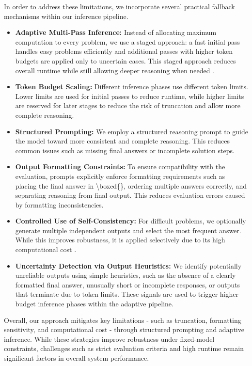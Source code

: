 \documentclass{article}
\begin{document}
In order to address these limitations, we incorporate several practical fallback mechanisms within our inference pipeline.
\begin{itemize}
    \item \textbf{Adaptive Multi-Pass Inference:} Instead of allocating maximum computation to every problem, we use a staged approach: a fast initial pass handles easy problems efficiently and additional passes with higher token budgets are applied only to uncertain cases. This staged approach reduces overall runtime while still allowing deeper reasoning when needed \citet{snell2024scaling}.
    \item \textbf{Token Budget Scaling:} Different inference phases use different token limits. Lower limits are used for initial passes to reduce runtime, while higher limits are reserved for later stages to reduce the risk of truncation and allow more complete reasoning.
    \item \textbf{Structured Prompting:} We employ a structured reasoning prompt to guide the model toward more consistent and complete reasoning. This reduces common issues such as missing final answers or incomplete solution steps.
    \item \textbf{Output Formatting Constraints:} To ensure compatibility with the evaluation, prompts explicitly enforce formatting requirements such as placing the final answer in \textbackslash boxed\{\}, ordering multiple answers correctly, and separating reasoning from final output. This reduces evaluation errors caused by formatting inconsistencies.
    \item \textbf{Controlled Use of Self-Consistency:} For difficult problems, we optionally generate multiple independent outputs and select the most frequent answer. While this improves robustness, it is applied selectively due to its high computational cost \cite{wang2022selfconsistency}.
    \item \textbf{Uncertainty Detection via Output Heuristics:} We identify potentially unreliable outputs using simple heuristics, such as the absence of a clearly formatted final answer, unusually short or incomplete responses, or outputs that terminate due to token limits. These signals are used to trigger higher-budget inference phases within the adaptive pipeline. 
\end{itemize}

Overall, our approach mitigates key limitations - such as truncation, formatting sensitivity, and computational cost - through structured prompting and adaptive inference. While these strategies improve robustness under fixed-model constraints, challenges such as strict evaluation criteria and high runtime remain significant factors in overall system performance.
\end{document}
